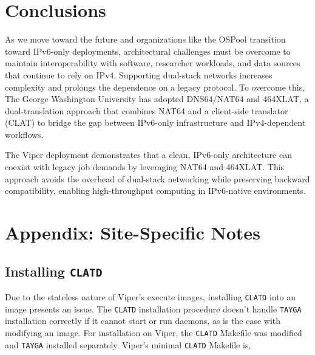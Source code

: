 \documentclass[11pt]{article}
\begin{document}
\section{Conclusions}


As we move toward the future and organizations like the OSPool transition toward IPv6-only deployments, architectural challenges must be overcome to maintain interoperability with software, researcher workloads, and data sources that continue to rely on IPv4. Supporting dual-stack networks increases complexity and prolongs the dependence on a legacy protocol. To overcome this, The George Washington University has adopted DNS64/NAT64 and 464XLAT, a dual-translation approach that combines NAT64 and a client-side translator (CLAT) to bridge the gap between IPv6-only infrastructure and IPv4-dependent workflows.

The Viper deployment demonstrates that a clean, IPv6-only architecture can coexist with legacy job demands by leveraging NAT64 and 464XLAT. This approach avoids the overhead of dual-stack networking while preserving backward compatibility, enabling high-throughput computing in IPv6-native environments.

\section{Appendix: Site-Specific Notes}
\subsection{Installing \texttt{CLATD}}
Due to the stateless nature of Viper's execute images, installing \texttt{CLATD} into an image presents an issue. The \texttt{CLATD} installation procedure doesn't handle \texttt{TAYGA} installation correctly if it cannot start or run daemons, as is the case with modifying an image.  For installation on Viper,  the \texttt{CLATD} Makefile was modified and \texttt{TAYGA} installed separately.  Viper's minimal \texttt{CLATD} Makefile is,
\end{document}
